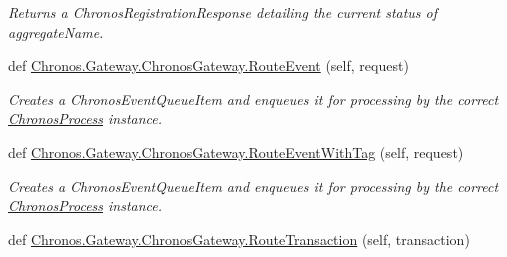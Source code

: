 \begin{DoxyCompactItemize}
\begin{DoxyCompactList}\small\item\em Returns a Chronos\+Registration\+Response detailing the current status of {\ttfamily aggregate\+Name}. \end{DoxyCompactList}\item 
def \hyperlink{group__Chronos_gacbe9f7549ce9b5f11f2cb3d4dca74638}{Chronos.\+Gateway.\+Chronos\+Gateway.\+Route\+Event} (self, request)
\begin{DoxyCompactList}\small\item\em Creates a Chronos\+Event\+Queue\+Item and enqueues it for processing by the correct \hyperlink{classChronos_1_1Gateway_1_1ChronosProcess}{Chronos\+Process} instance. \end{DoxyCompactList}\item 
def \hyperlink{group__Chronos_gaea90e7dc86d552e1e9f9b66d47858d37}{Chronos.\+Gateway.\+Chronos\+Gateway.\+Route\+Event\+With\+Tag} (self, request)
\begin{DoxyCompactList}\small\item\em Creates a Chronos\+Event\+Queue\+Item and enqueues it for processing by the correct \hyperlink{classChronos_1_1Gateway_1_1ChronosProcess}{Chronos\+Process} instance. \end{DoxyCompactList}\item 
def \hyperlink{group__Chronos_gaa906b0081fb403254dc6fcc4d718629f}{Chronos.\+Gateway.\+Chronos\+Gateway.\+Route\+Transaction} (self, transaction)\hypertarget{group__Chronos_gaa906b0081fb403254dc6fcc4d718629f}{}\label{group__Chronos_gaa906b0081fb403254dc6fcc4d718629f}


\end{DoxyCompactItemize}
